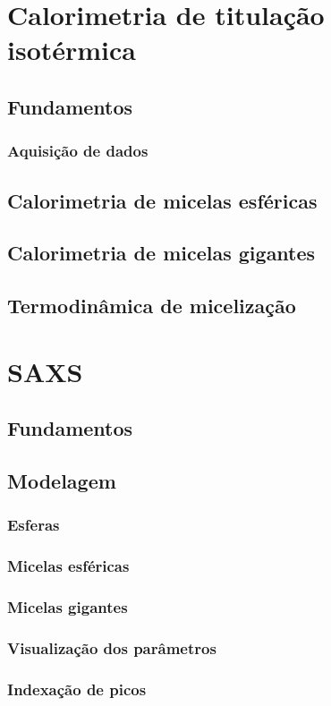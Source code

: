 \documentclass[a4paper, 10pt]{book}
\begin{document}
	\chapter{Calorimetria de titulação isotérmica}
		\section{Fundamentos}
			\subsection{Aquisição de dados}
		\section{Calorimetria de micelas esféricas}
		\section{Calorimetria de micelas gigantes}
		\section{Termodinâmica de micelização}
	\chapter{SAXS}
		\section{Fundamentos}
		\section{Modelagem}
			\subsection{Esferas}
			\subsection{Micelas esféricas}
			\subsection{Micelas gigantes}
			\subsection{Visualização dos parâmetros}
			\subsection{Indexação de picos}
\end{document}
